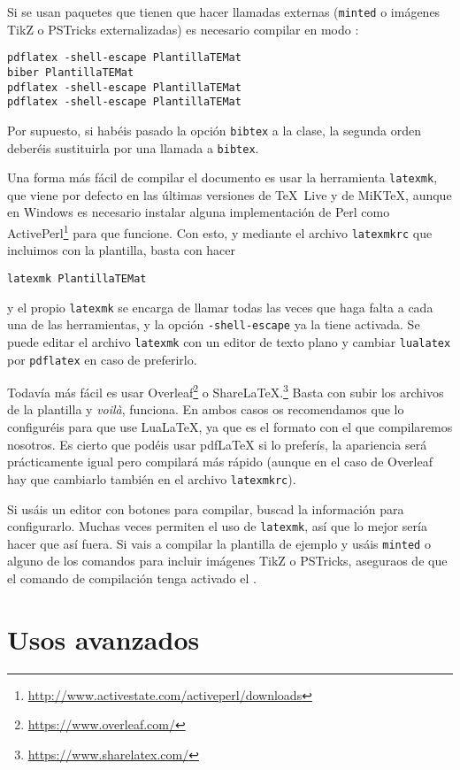 \documentclass[bibtex, anon]{TEMat-article}
\begin{document}
Si se usan paquetes que tienen que hacer llamadas externas (\verb+minted+ o imágenes TikZ o PSTricks externalizadas) es necesario compilar en modo :
\begin{verbatim}
pdflatex -shell-escape PlantillaTEMat
biber PlantillaTEMat
pdflatex -shell-escape PlantillaTEMat
pdflatex -shell-escape PlantillaTEMat
\end{verbatim}

Por supuesto, si habéis pasado la opción \verb+bibtex+ a la clase, la segunda orden deberéis sustituirla por una llamada a \verb+bibtex+.

Una forma más fácil de compilar el documento es usar la herramienta \verb+latexmk+, que viene por defecto en las últimas versiones de \TeX~Live y de MiK\TeX{}, aunque en Windows es necesario instalar alguna implementación de Perl como ActivePerl\footnote{\url{http://www.activestate.com/activeperl/downloads}} para que funcione.
Con esto, y mediante el archivo \verb+latexmkrc+ que incluimos con la plantilla, basta con hacer
\begin{verbatim}
latexmk PlantillaTEMat
\end{verbatim}
y el propio \verb+latexmk+ se encarga de llamar todas las veces que haga falta a cada una de las herramientas, y la opción \verb+-shell-escape+ ya la tiene activada.
Se puede editar el archivo \verb+latexmk+ con un editor de texto plano y cambiar \verb+lualatex+ por \verb+pdflatex+ en caso de preferirlo.

Todavía más fácil es usar Overleaf\footnote{\url{https://www.overleaf.com/}} o ShareLaTeX.\footnote{\url{https://www.sharelatex.com/}}
Basta con subir los archivos de la plantilla y \emph{voilà}, funciona.
En ambos casos os recomendamos que lo configuréis para que use LuaLaTeX, ya que es el formato con el que compilaremos nosotros.
Es cierto que podéis usar pdfLaTeX si lo preferís, la apariencia será prácticamente igual pero compilará más rápido (aunque en el caso de Overleaf hay que cambiarlo también en el archivo \verb+latexmkrc+).

Si usáis un editor con botones para compilar, buscad la información para configurarlo.
Muchas veces permiten el uso de \verb+latexmk+, así que lo mejor sería hacer que así fuera.
Si vais a compilar la plantilla de ejemplo y usáis \verb+minted+ o alguno de los comandos para incluir imágenes TikZ o PSTricks, aseguraos de que el comando de compilación tenga activado el .


\section{Usos avanzados}
\end{document}
